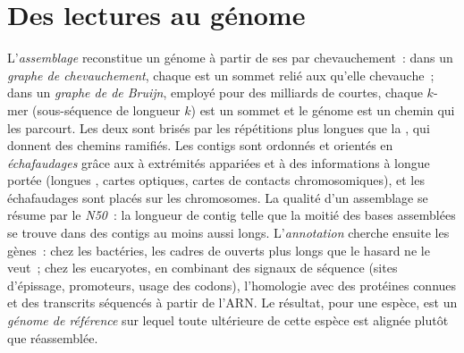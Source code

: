 \section{Des lectures au génome}

\begin{definition}\label{def:b3:genomics:assembly}
L'\emph{assemblage} reconstitue un génome à partir de ses  par
chevauchement~: dans un \emph{graphe de chevauchement}, chaque 
est un sommet relié aux  qu'elle chevauche~; dans un
\emph{graphe de de Bruijn}, employé pour des milliards de 
courtes, chaque $k$-mer (sous-séquence de longueur $k$) est un sommet et
le génome est un chemin qui les parcourt. Les deux sont brisés par les
répétitions plus longues que la , qui donnent des chemins
ramifiés. Les contigs sont ordonnés et orientés en \emph{échafaudages}
grâce aux  à extrémités appariées et à des informations à longue
portée (longues , cartes optiques, cartes de contacts
chromosomiques), et les échafaudages sont placés sur les chromosomes. La
qualité d'un assemblage se résume par le \emph{N50}~: la longueur de
contig telle que la moitié des bases assemblées se trouve dans des
contigs au moins aussi longs. L'\emph{annotation} cherche ensuite les
gènes~: chez les bactéries, les cadres de  ouverts plus longs que
le hasard ne le veut~; chez les eucaryotes, en combinant des signaux de
séquence (sites d'épissage, promoteurs, usage des codons), l'homologie
avec des protéines connues et des transcrits séquencés à partir de
l'ARN. Le résultat, pour une espèce, est un \emph{génome de référence}
sur lequel toute  ultérieure de cette espèce est alignée plutôt
que réassemblée.
\end{definition}

